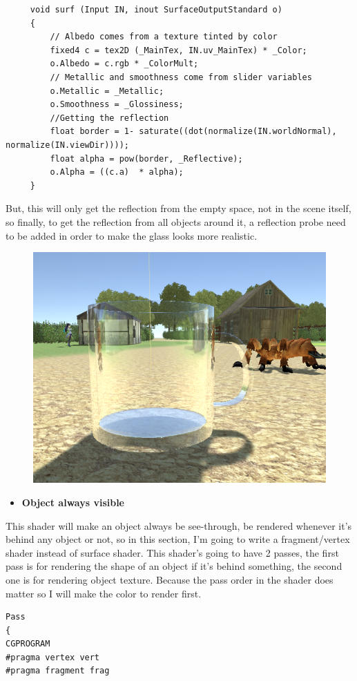 \documentclass[a4paper, 13pt]{extarticle}
\begin{document}
{\begin{figure}[h]
  	\end{figure}
     \begin{lstlisting}
     void surf (Input IN, inout SurfaceOutputStandard o)
     {
	     // Albedo comes from a texture tinted by color
	     fixed4 c = tex2D (_MainTex, IN.uv_MainTex) * _Color;
	     o.Albedo = c.rgb * _ColorMult;
	     // Metallic and smoothness come from slider variables
	     o.Metallic = _Metallic;
	     o.Smoothness = _Glossiness;
	     //Getting the reflection
	     float border = 1- saturate((dot(normalize(IN.worldNormal), normalize(IN.viewDir))));
	     float alpha = pow(border, _Reflective);
	     o.Alpha = ((c.a)  * alpha);
     }
      \end{lstlisting}
      But, this will only get the reflection from the empty space, not in the scene itself, so finally, to get the reflection from all objects around it, a reflection probe need to be added in order to make the glass looks more realistic.
      \begin{figure}[h]
      	\begin{minipage}{1\textwidth}
      		\centering
      		\includegraphics[width=0.4\linewidth]{intructions/reflection_probe.png}
      		\centering
      		\label{fig:test32}
      	\end{minipage}      	
      \end{figure}
  \begin{itemize}
 	\item \bfseries Object always visible 
  \end{itemize}
This shader will make an object always be see-through, be rendered whenever it's behind any object or not, so in this section, I'm going to write a fragment/vertex shader instead of surface shader. This shader's going to have 2 passes, the first pass is for rendering the shape of an object if it's behind something, the second one is for rendering object texture. Because the pass order in the shader does matter so I will make the color to render first. 

\begin{lstlisting}
Pass
{
CGPROGRAM
#pragma vertex vert
#pragma fragment frag


\end{lstlisting}}
\end{document}
